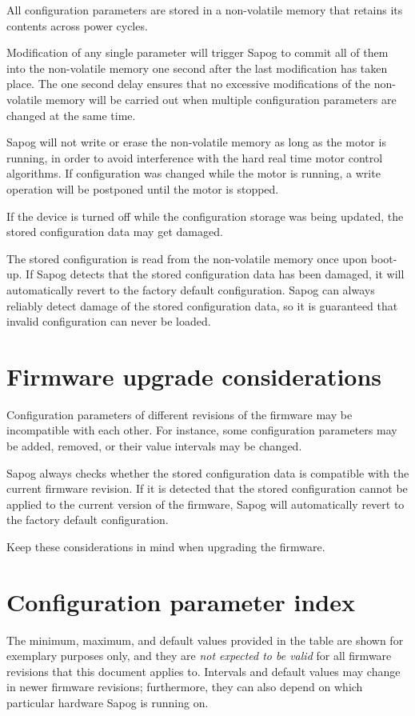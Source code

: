 \documentclass{zubaxdoc}
\begin{document}
All configuration parameters are stored in a non-volatile memory
that retains its contents across power cycles.

Modification of any single parameter will trigger Sapog to commit all of them into the non-volatile
memory one second after the last modification has taken place.
The one second delay ensures that no excessive modifications of the non-volatile memory will be carried out
when multiple configuration parameters are changed at the same time.

Sapog will not write or erase the non-volatile memory as long as the motor is running, in order to
avoid interference with the hard real time motor control algorithms.
If configuration was changed while the motor is running,
a write operation will be postponed until the motor is stopped.

If the device is turned off while the configuration storage was being updated,
the stored configuration data may get damaged.

The stored configuration is read from the non-volatile memory once upon boot-up.
If Sapog detects that the stored configuration data has been damaged,
it will automatically revert to the factory default configuration.
Sapog can always reliably detect damage of the stored configuration data,
so it is guaranteed that invalid configuration can never be loaded.

\section{Firmware upgrade considerations}

Configuration parameters of different revisions of the firmware may be incompatible with each other.
For instance, some configuration parameters may be added, removed, or their value intervals may be changed.

Sapog always checks whether the stored configuration data is compatible with the current firmware revision.
If it is detected that the stored configuration cannot be applied to the current version of the firmware,
Sapog will automatically revert to the factory default configuration.

Keep these considerations in mind when upgrading the firmware.

\section{Configuration parameter index}

The minimum, maximum, and default values provided in the table are shown for exemplary purposes only,
and they are \emph{not expected to be valid} for all firmware revisions that this document applies to.
Intervals and default values may change in newer firmware revisions; furthermore,
they can also depend on which particular hardware Sapog is running on.
\end{document}
